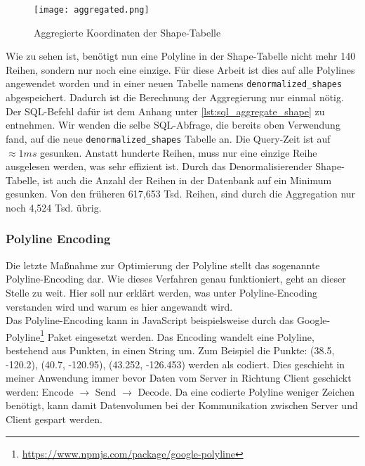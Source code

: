     \begin{figure}[htbp]
      \begin{center}
        \texttt{[image: aggregated.png]}
        \caption{Aggregierte Koordinaten der Shape-Tabelle}
        \label{fig:aggregated}
      \end{center}
    \end{figure}

    Wie zu sehen ist, benötigt nun eine Polyline in der Shape-Tabelle nicht mehr 140 Reihen, sondern nur noch eine einzige. Für diese Arbeit ist dies auf alle Polylines angewendet worden und in einer neuen Tabelle namens \texttt{denormalized\_shapes} abgespeichert. Dadurch ist die Berechnung der Aggregierung nur einmal nötig. Der SQL-Befehl dafür ist dem Anhang unter \ref{lst:sql_aggregate_shape} zu entnehmen.
    Wir wenden die selbe SQL-Abfrage, die bereits oben Verwendung fand, auf die neue \texttt{denormalized\_shapes} Tabelle an. Die Query-Zeit ist auf $\approx1ms$ gesunken. Anstatt hunderte Reihen, muss nur eine einzige Reihe ausgelesen werden, was sehr effizient ist. Durch das Denormalisieren\footnotemark der Shape-Tabelle, ist auch die Anzahl der Reihen in der Datenbank auf ein Minimum gesunken. Von den früheren 617,653 Tsd. Reihen, sind durch die Aggregation nur noch 4,524 Tsd. übrig.

  

  \subsubsection{Polyline Encoding}
  \label{ssub:polyline_encoding}
    Die letzte Maßnahme zur Optimierung der Polyline stellt das sogenannte Polyline-Encoding dar. Wie dieses Verfahren genau funktioniert, geht an dieser Stelle zu weit. Hier soll nur erklärt werden, was unter Polyline-Encoding verstanden wird und warum es hier angewandt wird.\\

    Das Polyline-Encoding kann in JavaScript beispielsweise durch das Google-Polyline\footnote{\url{https://www.npmjs.com/package/google-polyline}} Paket eingesetzt werden. Das Encoding wandelt eine Polyline, bestehend aus Punkten, in einen String um. Zum Beispiel die Punkte: (38.5, -120.2), (40.7, -120.95), (43.252, -126.453) werden als
    \colorbox{materialGrey}{\texttt{\color{white}{\_p\textasciitilde iF\textasciitilde ps|U\_ulLnnqC\_mqNvxq`@}}}
    codiert. Dies geschieht in meiner Anwendung immer bevor Daten vom Server in Richtung Client geschickt werden: Encode $\rightarrow$ Send $\rightarrow$ Decode. Da eine codierte Polyline weniger Zeichen benötigt, kann damit Datenvolumen bei der Kommunikation zwischen Server und Client gespart werden.

